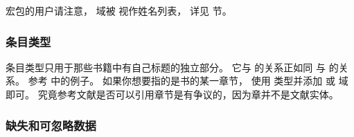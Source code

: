 
 宏包的用户请注意， 域被 \biblatex 视作姓名列表，
详见  节。

\subsubsection[\texttt{@inbook} 条目类型]{ 条目类型}
\label{bib:use:inb}


 条目类型只用于那些书籍中有自己标题的独立部分。
它与  的关系正如同  与  的关系。
参考  中的例子。
如果你想要指的是书的某一章节，
使用  类型并添加  或  域即可。
究竟参考文献是否可以引用章节是有争议的，因为章并不是文献实体。

\subsubsection{缺失和可忽略数据}%
\label{bib:use:key}



